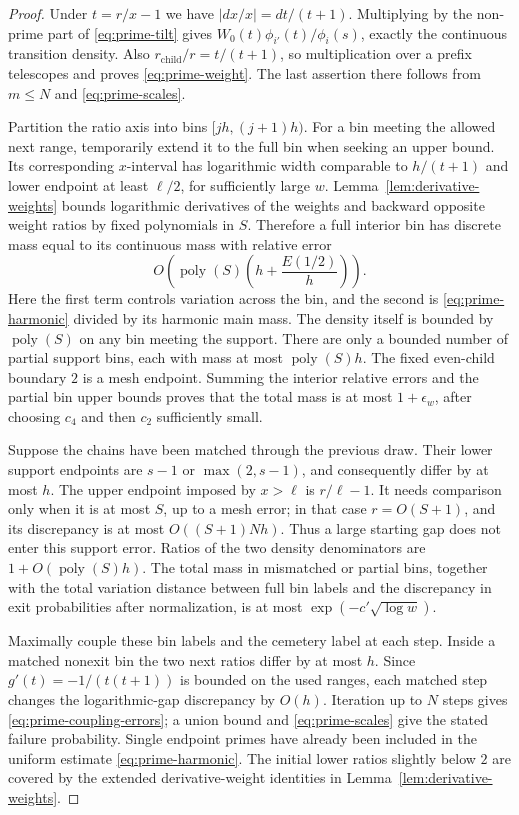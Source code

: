 \begin{proof}
Under $t=r/x-1$ we have $|dx/x|=dt/(t+1)$.  Multiplying by the
non-prime part of \eqref{eq:prime-tilt} gives
$W_0(t)\phi_{i'}(t)/\phi_i(s)$, exactly the continuous transition
density.  Also $r_{\mathrm{child}}/r=t/(t+1)$, so multiplication over a
prefix telescopes and proves \eqref{eq:prime-weight}.  The last
assertion there follows from $m\leq N$ and \eqref{eq:prime-scales}.

Partition the ratio axis into bins $[jh,(j+1)h)$.  For a bin meeting
the allowed next range, temporarily extend it to the full bin when
seeking an upper bound.  Its corresponding $x$-interval has logarithmic
width comparable to $h/(t+1)$ and lower endpoint at least $\ell/2$,
for sufficiently large $w$.  Lemma~\ref{lem:derivative-weights}
bounds logarithmic derivatives of the weights and backward opposite
weight ratios by fixed polynomials in $S$.  Therefore a full interior
bin has discrete mass equal to its continuous mass with relative error
\begin{equation}\label{eq:prime-bin-error}
 O\left(\operatorname{poly}(S)
             \left(h+\frac{E(1/2)}h\right)\right).
\end{equation}
Here the first term controls variation across the bin, and the second
is \eqref{eq:prime-harmonic} divided by its harmonic main mass.
The density itself is bounded by $\operatorname{poly}(S)$ on any
bin meeting the support.  There are only a bounded number of partial
support bins, each with mass at most
$\operatorname{poly}(S)h$.  The fixed even-child boundary $2$ is a
mesh endpoint.  Summing the interior relative errors and the partial
bin upper bounds proves that the total mass is at most
$1+\epsilon_w$, after choosing $c_4$ and then $c_2$ sufficiently small.

Suppose the chains have been matched through the previous draw.  Their
lower support endpoints are $s-1$ or $\max(2,s-1)$, and consequently
differ by at most $h$.  The upper endpoint imposed by $x>\ell$ is
$r/\ell-1$.  It needs comparison only when it is at most $S$, up to a
mesh error; in that case $r=O(S+1)$, and its discrepancy is at most
$O((S+1)Nh)$.  Thus a large starting gap does not enter this support
error.  Ratios of the two density denominators are
$1+O(\operatorname{poly}(S)h)$.  The total mass in mismatched or partial
bins, together with the total variation distance between full bin
labels and the discrepancy in exit probabilities after normalization,
is at most $\exp(-c'\sqrt{\log w})$.

Maximally couple these bin labels and the cemetery label at each step.
Inside a matched nonexit bin the two next ratios differ by at most $h$.
Since $g'(t)=-1/(t(t+1))$ is bounded on the used ranges, each matched
step changes the logarithmic-gap discrepancy by $O(h)$.  Iteration up
to $N$ steps gives \eqref{eq:prime-coupling-errors}; a union bound and
\eqref{eq:prime-scales} give the stated failure probability.  Single
endpoint primes have already been included in the uniform estimate
\eqref{eq:prime-harmonic}.  The initial lower ratios slightly below $2$
are covered by the extended derivative-weight identities in
Lemma~\ref{lem:derivative-weights}.
\end{proof}

